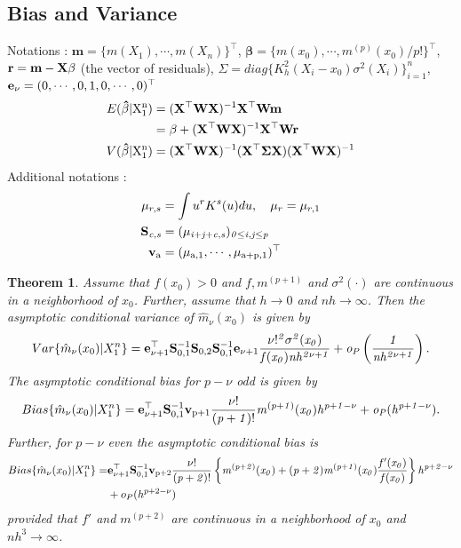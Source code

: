 \documentclass[12pt]{article}
\renewcommand{\=}[1]{\stackrel{#1}{=}} %
\newtheorem{thm}{Theorem}[section]
\theoremstyle{definition}
\begin{document}
\subsection{Bias and Variance}
	Notations : $\mathbf{m}=\{m(X_1),\cdots,m(X_n)\}^{\top}$, $\mathbf{\beta}=\{m(x_0),\cdots,m^{(p)}(x_0)/p!\}^{\top}$, $\bf r=m-X\beta$ (the vector of residuals), $\Sigma=diag\{K_h^2(X_i-x_0)\sigma^2(X_i)\}_{i=1}^n$, $\bf e_{\nu}=(\rm0,\cdots,0,1,0,\cdots,0)^{\top}$
	\begin{align}
	E(\bf\hat{\beta}|\rm X_1^n)&=\bf(X^{\top}WX)^{\rm-1}\bf X^{\top}Wm\\
	&=\bf\beta+(X^{\top}WX)^{\rm-1}\bf X^{\top}Wr\\
	V(\bf\hat{\beta}|\rm X_1^n)&=\bf(X^{\top}WX)^{\rm-1}(\bf X^{\top}\Sigma X)(X^{\top}WX)^{\rm-1}
	\end{align}
	Additional notations :
	\begin{align}
	\mu_{r,s}&=\int u^rK^s(u)du,\quad\mu_r=\mu_{r,1}\\
	\bf S_{\it c,s}&=(\it\mu_{i+j+c,s})_{0\leq i,j\leq p}\\
	\bf v_{\rm a}&=\rm(\mu_{a,1},\cdots,\mu_{a+p,1})^{\top}
	\end{align}
	\begin{thm}
		Assume that $f(x_0)>0$ and $f,m^{(p+1)}$ and $\sigma^2(\cdot)$ are continuous in a neighborhood of  $x_0$. Further, assume that $h\rightarrow0$ and $nh\rightarrow\infty$. Then the asymptotic conditional variance of $\hat{m}_{\nu}(x_0)$ is given by
		\begin{align}
		Var\{\hat{m}_{\nu}(x_0)|X_1^n\}=\bf e_{\rm\nu+1}^{\top}\bf S_{\rm0,1}^{\rm-1}\bf S_{\rm0,2}\bf S_{\rm0,1}^{\rm-1}\bf e_{\rm\nu+1}\it\frac{\nu!^2\sigma^2(x_0)}{f(x_0)nh^{2\nu+1}}+o_P\left(\frac{1}{nh^{2\nu+1}}\right).
		\end{align}
		The asymptotic conditional bias for $p-\nu$ odd is given by
		\begin{align}
		Bias\{\hat{m}_{\nu}(x_0)|X_1^n\}=\bf e_{\rm\nu+1}^{\top}\bf S_{\rm0,1}^{\rm-1}\bf v_{\rm p+1}\it\frac{\nu!}{(p+1)!}m^{(p+1)}(x_0)h^{p+1-\nu}+o_P(h^{p+1-\nu}).
		\end{align}
		Further, for $p-\nu$ even the asymptotic conditional bias is
		\begin{align}
		Bias\{\hat{m}_{\nu}(x_0)|X_1^n\}=&\bf e_{\rm\nu+1}^{\top}\bf S_{\rm0,1}^{\rm-1}\bf v_{\rm p+2}\it\frac{\nu!}{(p+2)!}\left\{m^{(p+2)}(x_0)+(p+2)m^{(p+1)}(x_0)\frac{f'(x_0)}{f(x_0)}
		\right\}h^{p+2-\nu}\nonumber
		\\&+o_P(h^{p+2-\nu})
		\end{align}
		provided that $f'$ and $m^{(p+2)}$ are continuous in a neighborhood of $x_0$ and $nh^3\rightarrow\infty$.
	\end{thm}
\end{document}
